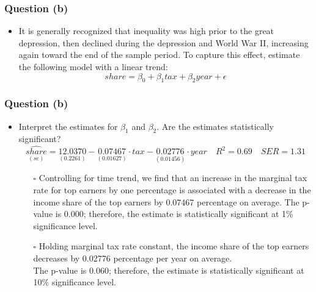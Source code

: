 \documentclass[11pt, xcolor=x11names,compress]{beamer}
\begin{document}
\begin{frame}[fragile,t]
\frametitle{Question (b)}
\begin{itemize}
    \item It is generally recognized that inequality was high prior to the great depression, then declined during the depression and World War II, increasing again toward the end of the sample period. To capture this effect, estimate the following model with a linear trend:
    $$share = \beta_0 + \beta_1tax + \beta_2year + \epsilon$$
\end{itemize}
\end{frame}

\begin{frame}[fragile,t]
\frametitle{Question (b)}
\begin{itemize}
    \item Interpret the estimates for $\beta_1$ and $\beta_2$. Are the estimates statistically significant?\\
\pause
\begin{equation*}
    \underset{(se)}{\widehat{share}} = \underset{(0.2261)}{12.0370} - \underset{(0.01627)}{0.07467} \cdot tax - \underset{(0.01456)}{0.02776}\cdot year \quad R^2=0.69 \quad SER = 1.31
\end{equation*}
\begin{itemize}
    \item [$\square$] Controlling for time trend, we find that an increase in the marginal tax rate for top earners by one percentage is associated with a decrease in the income share of the top earners by 0.07467 percentage on average. The p-value is 0.000; therefore, the estimate is statistically significant at 1\% significance level.
    \item [$\square$] Holding marginal tax rate constant, the income share of the top earners decreases by 0.02776 percentage per year on average. \\
    The p-value is 0.060; therefore, the estimate is statistically significant at 10\% significance level.
\end{itemize}
\end{itemize}
\end{frame}
\end{document}
